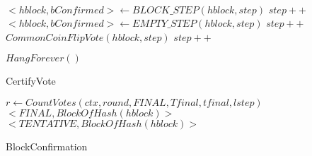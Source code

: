 \documentclass[10pt,a4paper]{article}
\begin{document}
\begin{algorithm}
    \begin{algorithmic}[1]

    {
        \\
        \State $<hblock, bConfirmed> \gets BLOCK\_STEP(hblock, step)$
        \EndIf
        \State $step++$\\
   
        \State $<hblock, bConfirmed> \gets EMPTY\_STEP(hblock,step)$
        \EndIf
        \State $step++$\\

        \State $CommonCoinFlipVote(hblock, step)$
        \State $step++$
    }
    \EndWhile

    \State $HangForever()$
    
    \EndFunction
    \end{algorithmic}
    \caption{CertifyVote}
\end{algorithm}


\begin{algorithm}
    \begin{algorithmic}[1]

    \State $r \gets CountVotes(ctx, round, FINAL, Tfinal, tfinal, lstep)$
    {
        \State \Return $<FINAL, BlockOfHash(hblock)>$ 
    }
    {
        \State \Return $<TENTATIVE, BlockOfHash(hblock)>$
    }
        
    \EndFunction
    \end{algorithmic}
    \caption{BlockConfirmation}
\end{algorithm}
\end{document}
